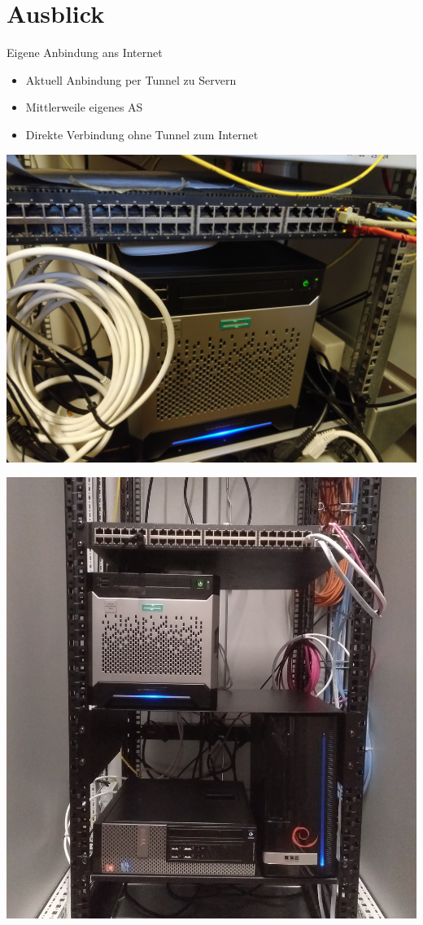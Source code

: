 \documentclass{beamer}
\begin{document}
	\section{Ausblick}
	\begin{frame}{Eigene Anbindung ans Internet}
		\begin{itemize}
			\item Aktuell Anbindung per Tunnel zu Servern
			\item Mittlerweile eigenes AS
			\item Direkte Verbindung ohne Tunnel zum Internet
		\end{itemize}
	\end{frame}
	\begin{frame}
		\centering
		\includegraphics[width=\framewidth]{media/zbau-server.jpg}
	\end{frame}
	\begin{frame}
		\centering
		\includegraphics[height=\textheight]{media/zbau-server-neu.jpg}
	\end{frame}

\end{document}
